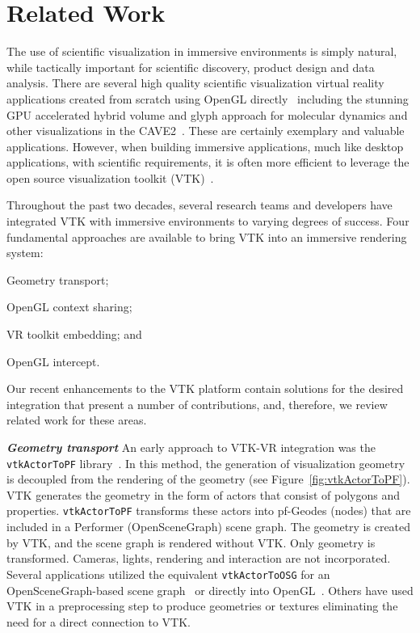 \section{Related Work}

The use of scientific visualization in immersive environments is simply natural, while tactically important for scientific discovery, product design and data analysis.
There are several high quality scientific visualization virtual reality applications created from scratch using OpenGL directly~\cite{Billen:2008, LaViola:2007, Schulze:2001, Rantzau:1998} including the stunning GPU accelerated hybrid volume and glyph approach for molecular dynamics and other visualizations in the CAVE2~\cite{Reda:2013, Reda:2013a}.
These are certainly exemplary and valuable applications.
However, when building immersive applications, much like desktop applications, with scientific requirements, it is often more efficient to leverage the open source visualization toolkit (VTK)~\cite{Schroeder:2004}.

Throughout the past two decades, several research teams and developers have integrated VTK with immersive environments to varying degrees of success.
Four fundamental approaches are available to bring VTK into an
immersive rendering system:

\begin{compactitem}
\item Geometry transport;
\item OpenGL context sharing;
\item VR toolkit embedding; and
\item OpenGL intercept.

\end{compactitem}

Our recent enhancements to the VTK platform contain solutions for the desired integration that present a number of contributions, and, therefore, we review related work for these areas.

\textbf{\textit{Geometry transport}}
An early approach to VTK-VR integration was the \texttt{vtkActorToPF} library~\cite{Leigh98limbo/vtk}.
In this method, the generation of visualization geometry is decoupled from
the rendering of the geometry (see Figure~\ref{fig:vtkActorToPF}). 
VTK generates the geometry in the form of actors that consist of polygons and properties.
\texttt{vtkActorToPF} transforms these actors into pf-Geodes (nodes) that are included in a Performer (OpenSceneGraph) scene graph. The geometry is created by VTK, and the scene graph is rendered without VTK. Only geometry is transformed. Cameras, lights, rendering and interaction are not incorporated. Several applications utilized the equivalent \texttt{vtkActorToOSG} for an OpenSceneGraph-based scene graph~\cite{VE-Suite:2016} or directly into OpenGL~\cite{Ohno:2006}. Others have used VTK in a preprocessing step to produce geometries or textures eliminating the need for a direct connection to VTK\cite{Bivins:2005}.

